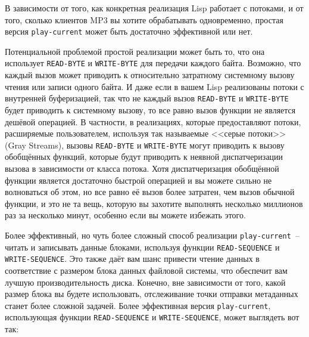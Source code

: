 В зависимости от того, как конкретная реализация Lisp работает с потоками, и от того,
сколько клиентов MP3 вы хотите обрабатывать одновременно, простая версия
\lstinline{play-current} может быть достаточно эффективной или нет.

Потенциальной проблемой простой реализации может быть то, что она использует
\lstinline{READ-BYTE} и \lstinline{WRITE-BYTE} для передачи каждого байта. Возможно, что каждый
вызов может приводить к относительно затратному системному вызову чтения или записи одного
байта.  И даже если в вашем Lisp реализованы потоки с внутренней буферизацией, так что не
каждый вызов \lstinline{READ-BYTE} и \lstinline{WRITE-BYTE} будет приводить к системному вызову, то
все равно вызов функции не является дешёвой операцией.  В частности, в реализациях,
которые предоставляют потоки, расширяемые пользователем, используя так называемые <<серые
потоки>> (Gray Streams), вызовы \lstinline{READ-BYTE} и \lstinline{WRITE-BYTE} могут приводить к
вызову обобщённых функций, которые будут приводить к неявной диспатчеризации вызова в
зависимости от класса потока.  Хотя диспатчеризация обобщённой функции является достаточно
быстрой операцией и вы можете сильно не волноваться об этом, но все равно её вызов более
затратен, чем вызов обычной функции, и это не та вещь, которую вы захотите выполнять
несколько миллионов раз за несколько минут, особенно если вы можете избежать этого.

Более эффективный, но чуть более сложный способ реализации \lstinline{play-current}~-- читать и
записывать данные блоками, используя функции \lstinline{READ-SEQUENCE} и \lstinline{WRITE-SEQUENCE}.
Это также даёт вам шанс привести чтение данных в соответствие с размером блока данных
файловой системы, что обеспечит вам лучшую производительность диска.  Конечно, вне
зависимости от того, какой размер блока вы будете использовать, отслеживание точки
отправки метаданных станет более сложной задачей.  Более эффективная версия
\lstinline{play-current}, использующая функции \lstinline{READ-SEQUENCE} и \lstinline{WRITE-SEQUENCE},
может выглядеть вот так:

